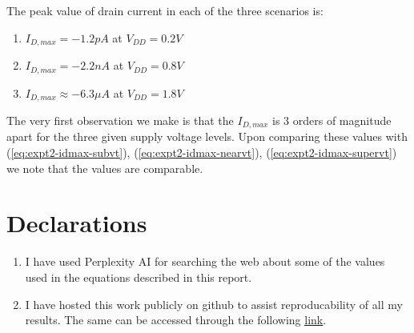 \documentclass[12pt,a4paper]{article}
\begin{document}
\noindent The peak value of drain current in each of the three scenarios is:

\begin{enumerate}
    \item $I_{D,max} = -1.2 pA$ at $V_{DD} = 0.2 V$
    \item $I_{D,max} = -2.2 nA$ at $V_{DD} = 0.8 V$
    \item $I_{D,max} \approx -6.3 \mu A$ at $V_{DD} = 1.8 V$
\end{enumerate}

\noindent The very first observation we make is that the $I_{D,max}$ is 3 orders of magnitude apart for the three given supply voltage levels. Upon comparing these values with (\ref{eq:expt2-idmax-subvt}), (\ref{eq:expt2-idmax-nearvt}), (\ref{eq:expt2-idmax-supervt}) we note that the values are comparable.

\section{Declarations}
\begin{enumerate}
    \item I have used Perplexity AI for searching the web about some of the values used in the equations described in this report.
    \item I have hosted this work publicly on github to assist reproducability of all my results. The same can be accessed through the following \href{https://github.com/iamkarthikbk/ee5311-2025}{\underline{link}}.
\end{enumerate}
\end{document}
